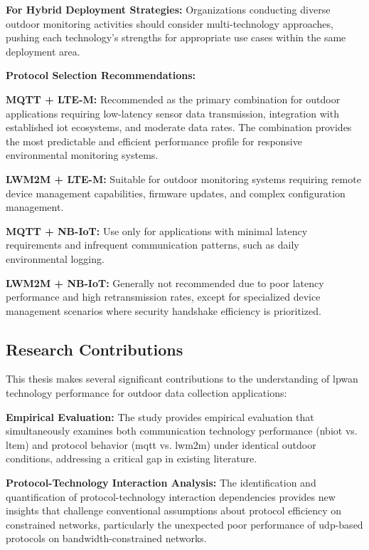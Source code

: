 \documentclass[12pt, english, openany]{book}
\begin{document}
\textbf{For Hybrid Deployment Strategies:} Organizations conducting diverse outdoor monitoring activities should consider multi-technology approaches, pushing each technology's strengths for appropriate use cases within the same deployment area.

\textbf{Protocol Selection Recommendations:}

\textbf{MQTT + LTE-M:} Recommended as the primary combination for outdoor applications requiring low-latency sensor data transmission, integration with established \gls{iot} ecosystems, and moderate data rates. The combination provides the most predictable and efficient performance profile for responsive environmental monitoring systems.

\textbf{LWM2M + LTE-M:} Suitable for outdoor monitoring systems requiring remote device management capabilities, firmware updates, and complex configuration management.

\textbf{MQTT + NB-IoT:} Use only for applications with minimal latency requirements and infrequent communication patterns, such as daily environmental logging.

\textbf{LWM2M + NB-IoT:} Generally not recommended due to poor latency performance and high retransmission rates, except for specialized device management scenarios where security handshake efficiency is prioritized.

\subsection{Research Contributions}

This thesis makes several significant contributions to the understanding of \gls{lpwan} technology performance for outdoor data collection applications:

\textbf{Empirical Evaluation:} The study provides empirical evaluation that simultaneously examines both communication technology performance (\gls{nbiot} vs. \gls{ltem}) and protocol behavior (\gls{mqtt} vs. \gls{lwm2m}) under identical outdoor conditions, addressing a critical gap in existing literature.

\textbf{Protocol-Technology Interaction Analysis:} The identification and quantification of protocol-technology interaction dependencies provides new insights that challenge conventional assumptions about protocol efficiency on constrained networks, particularly the unexpected poor performance of \gls{udp}-based protocols on bandwidth-constrained networks.
\end{document}
